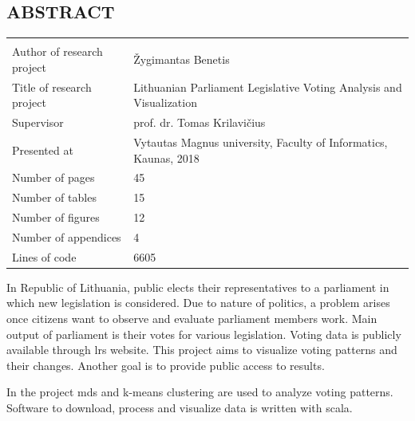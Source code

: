 \documentclass[a4paper,12pt]{article}
\begin{document}
	
	
	
	\begin{center}
		\section*{ABSTRACT}
	\end{center}
	
	
	
	\noindent
	\begin{center}
		\begin{tabular}{L{4.5cm} L{8cm}}
			\\ 
			Author of research project & Žygimantas Benetis \\
			Title of research project & Lithuanian Parliament Legislative Voting Analysis and Visualization\\
			Supervisor & prof. dr. Tomas Krilavičius\\
			Presented at & Vytautas Magnus university, Faculty of Informatics, Kaunas, 2018\\
			Number of pages & 45\\
			Number of tables & 15\\
			Number of figures & 12\\
			Number of appendices & 4\\
			Lines of code & 6605\\
		\end{tabular}
	\end{center} 
	
	\vspace{5mm}
	
	In Republic of Lithuania, public elects their representatives to a parliament in which new legislation is considered. Due to nature of politics, a problem arises once citizens want to observe and evaluate parliament members work. Main output of parliament is their votes for various legislation. Voting data is publicly available through \gls{lrs} website. This project aims to visualize voting patterns and their changes. Another goal is to provide public access to results.
	
	In the project \gls{mds} and \gls{k-means} clustering are used to analyze voting patterns. Software to download, process and visualize  data is written with \gls{scala}.
	
	\clearpage
	
\end{document}
